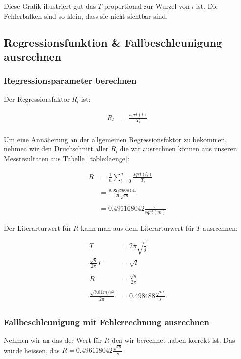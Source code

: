 \documentclass[12pt, a4paper, twoside]{article}
\begin{document}
Diese Grafik illustriert gut das $T$ proportional zur Wurzel von $l$ ist.
Die Fehlerbalken sind so klein, dass sie nicht sichtbar sind.

\subsection{Regressionsfunktion \& Fallbeschleunigung ausrechnen}
\subsubsection{Regressionsparameter berechnen}
Der Regressionsfaktor $R_l$ ist:

\begin{align*}
  R_l & = \frac{sqrt(l)}{T_l} \\
\end{align*}

Um eine Annäherung an der allgemeinen Regressionsfaktor zu bekommen,
nehmen wir den Druchschnitt aller $R_l$ die wir ausrechnen können aus unseren Messresultaten aus Tabelle~\ref{table:laenge}:

\begin{align*}
  \overline{R} & = \frac{1}{n}\sum_{i=0}^{n} \frac{sqrt(l_i)}{T_i} \\
  \\
               & = \frac{9.923360844s}{20\sqrt{m}}                 \\
  \\
               & = 0.496168042\frac{s}{sqrt(m)}
\end{align*}

Der Literarturwert für $R$ kann man aus dem Literarturwert für $T$ ausrechnen:

\begin{align*}
  T                             & = 2\pi \sqrt{\frac{l}{g}}    \\
  \frac{\sqrt{g}}{2\pi}T        & = \sqrt{l}                   \\
  \\
  R                             & = \frac{\sqrt{g}}{2\pi}      \\
  \\
  \frac{\sqrt{9.81m/s^2}}{2\pi} & = 0.498488\frac{\sqrt{m}}{s} \\
\end{align*}

\subsubsection{Fallbeschleunigung mit Fehlerrechnung ausrechnen}
Nehmen wir an das der Wert für $R$ den wir berechnet haben korrekt ist.
Das würde heissen, das $R = 0.496168042\frac{\sqrt{m}}{s}$
\end{document}
